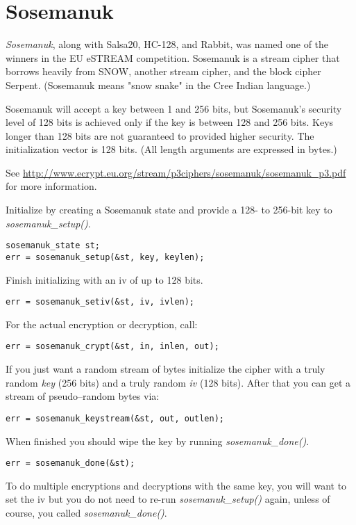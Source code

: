\documentclass[synpaper]{book}
\newcommand{\mysection}[1]    %
	{                   %
	\section{#1}
   \markboth{\textsf{www.libtom.net}}{\thesection ~ {#1}}
	}
\begin{document}
\mysection{Sosemanuk}

\textit{Sosemanuk}, along with Salsa20, HC-128, and Rabbit, was named one of the winners in
the EU eSTREAM competition.  Sosemanuk is a stream cipher that borrows heavily from SNOW,
another stream cipher, and the block cipher Serpent.  (Sosemanuk means "snow snake" in the
Cree Indian language.)

Sosemanuk will accept a key between 1 and 256 bits, but Sosemanuk's security level of 128
bits is achieved only if the key is between 128 and 256 bits.  Keys longer than 128 bits
are not guaranteed to provided higher security.  The initialization vector is 128 bits.
(All length arguments are expressed in bytes.)

See \url{http://www.ecrypt.eu.org/stream/p3ciphers/sosemanuk/sosemanuk_p3.pdf} for more
information.

Initialize by creating a Sosemanuk state and provide a 128- to 256-bit key to \textit{sosemanuk\_setup()}.
\begin{verbatim}
sosemanuk_state st;
err = sosemanuk_setup(&st, key, keylen);
\end{verbatim}

Finish initializing with an iv of up to 128 bits.
\begin{verbatim}
err = sosemanuk_setiv(&st, iv, ivlen);
\end{verbatim}

For the actual encryption or decryption, call:
\begin{verbatim}
err = sosemanuk_crypt(&st, in, inlen, out);
\end{verbatim}

If you just want a random stream of bytes initialize the cipher with a truly random
\textit{key} (256 bits) and a truly random \textit{iv} (128 bits). After that you can
get a stream of pseudo--random bytes via:
\begin{verbatim}
err = sosemanuk_keystream(&st, out, outlen);
\end{verbatim}

When finished you should wipe the key by running \textit{sosemanuk\_done()}.
\begin{verbatim}
err = sosemanuk_done(&st);
\end{verbatim}

To do multiple encryptions and decryptions with the same key, you will want to set the iv but
you do not need to re-run \textit{sosemanuk\_setup()} again, unless of course, you called
\textit{sosemanuk\_done()}.
\end{document}
